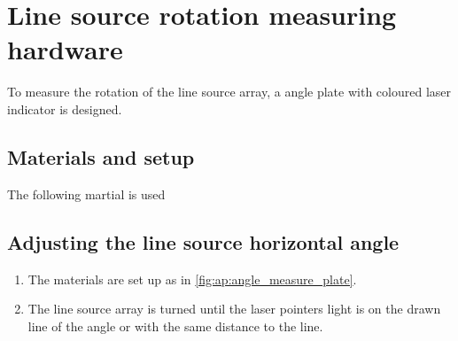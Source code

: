 \chapter{Line source rotation measuring hardware}
To measure the rotation of the line source array, a angle plate with coloured laser indicator is designed. 


\section*{Materials and setup}
The following martial is used

\startequipment
{}
\stopequipment


\section*{Adjusting the line source horizontal angle}


\begin{enumerate}
\item The materials are set up as in \autoref{fig:ap:angle_measure_plate}.
\item The line source array is turned until the laser pointers light is on the drawn line of the angle or with the same distance to the line.
\end{enumerate}





